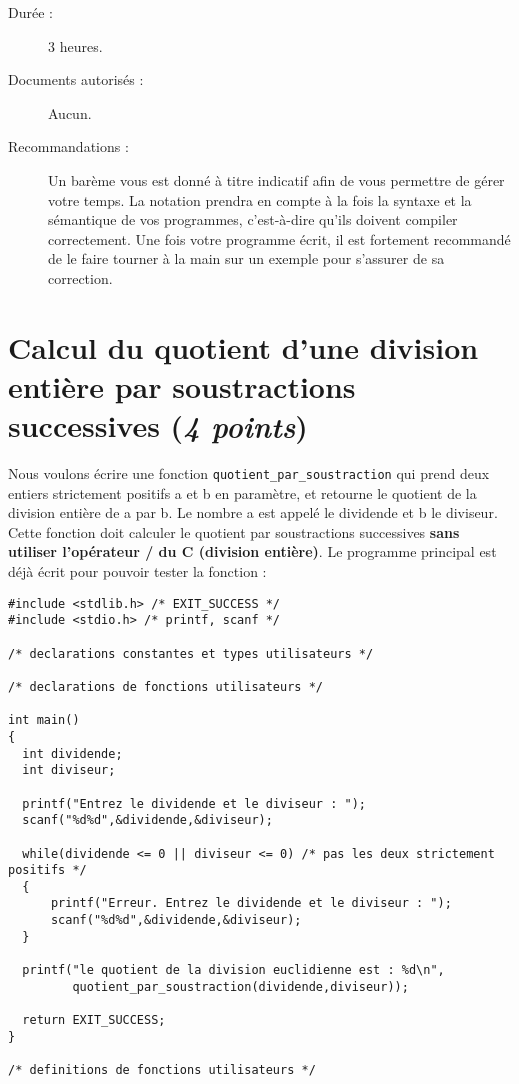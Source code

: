 
\newcommand{\commentaire}[1]{}


\begin{description}
\item[Durée :] 3 heures.
\item[Documents autorisés :] Aucun.
\item[Recommandations :] Un barème vous est donné à
titre indicatif afin de vous permettre de gérer votre temps. La
notation prendra en compte à la fois la syntaxe et la sémantique de
vos programmes, c'est-à-dire qu'ils doivent compiler correctement. Une
fois votre programme écrit, il est fortement recommandé de le faire tourner à la
main sur un exemple pour s'assurer de sa correction.
\end{description}

\section{Calcul du quotient d'une division entière par soustractions
  successives (\textit{4 points})}

Nous voulons écrire une fonction \verb|quotient_par_soustraction| qui
prend deux entiers strictement positifs a et b en paramètre, et
retourne le quotient de la division entière de a par b. Le nombre a est
appelé le dividende et b le diviseur. Cette fonction doit calculer le
quotient par soustractions successives \textbf{sans utiliser
  l'opérateur / du C (division entière)}. Le programme principal
est déjà écrit pour pouvoir tester la fonction :
\begin{verbatim}
#include <stdlib.h> /* EXIT_SUCCESS */
#include <stdio.h> /* printf, scanf */

/* declarations constantes et types utilisateurs */

/* declarations de fonctions utilisateurs */

int main()
{
  int dividende;
  int diviseur;

  printf("Entrez le dividende et le diviseur : ");
  scanf("%d%d",&dividende,&diviseur);

  while(dividende <= 0 || diviseur <= 0) /* pas les deux strictement positifs */
  {
      printf("Erreur. Entrez le dividende et le diviseur : ");
      scanf("%d%d",&dividende,&diviseur);
  }

  printf("le quotient de la division euclidienne est : %d\n",
         quotient_par_soustraction(dividende,diviseur));

  return EXIT_SUCCESS;
}

/* definitions de fonctions utilisateurs */
\end{verbatim}

